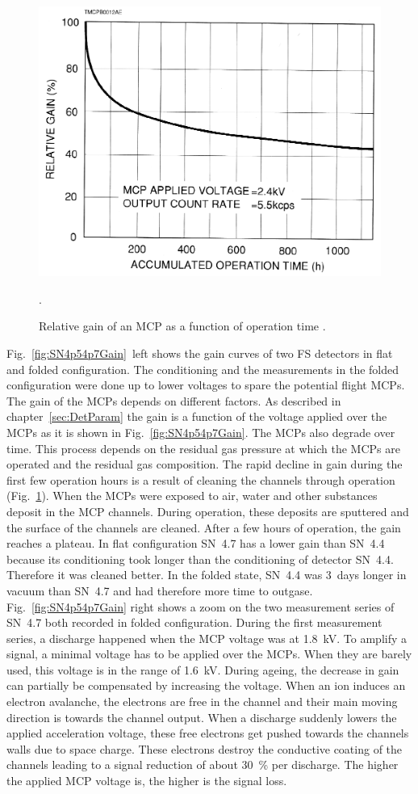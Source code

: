 		\begin{figure}[H] %
	\centering
	\includegraphics[width=.5\textwidth]{Experiments/MCP_relGain_timeevol.png}
	\caption{Relative gain of an MCP as a function of operation time \cite{LecNot_Wurz2017}.}
	\label{fig:MCPrelGainTime}.
\end{figure}
	Fig.~\ref{fig:SN4p54p7Gain}~left shows the gain curves of two FS detectors in flat and folded configuration. The conditioning and the measurements in the folded configuration were done up to lower voltages to spare the potential flight MCPs. The gain of the MCPs depends on different factors. As described in chapter~\ref{sec:DetParam} the gain is a function of the voltage applied over the MCPs as it is shown in Fig.~\ref{fig:SN4p54p7Gain}. 
	The MCPs also degrade over time. This process depends on the residual gas pressure at which the MCPs are operated and the residual gas composition. The rapid decline in gain during the first few operation hours is a result of cleaning the channels through operation (Fig.~\ref{fig:MCPrelGainTime}).
	When the MCPs were exposed to air, water and other substances deposit in the MCP channels. During operation, these deposits are sputtered and the surface of the channels are cleaned. After a few hours of operation, the gain reaches a plateau. In flat configuration SN~4.7 has a lower gain than SN~4.4 because its conditioning took longer than the conditioning of detector SN~4.4. Therefore it was cleaned better. In the folded state, SN~4.4 was 3~days longer in vacuum than SN~4.7 and had therefore more time to outgase. Fig.~\ref{fig:SN4p54p7Gain} right shows a zoom on the two measurement series of SN~4.7 both recorded in folded configuration. During the first measurement series, a discharge happened when the MCP voltage was at 1.8~kV. To amplify a signal, a minimal voltage has to be applied over the MCPs. When they are barely used, this voltage is in the range of 1.6~kV. During ageing, the decrease in gain can partially be compensated by increasing the voltage. When an ion induces an electron avalanche, the electrons are free in the channel and their main moving direction is towards the channel output. When a discharge suddenly lowers the applied acceleration voltage, these free electrons get pushed towards the channels walls due to space charge. These electrons destroy the conductive coating of the channels leading to a signal reduction of about 30~\% per discharge. The higher the applied MCP voltage is, the higher is the signal loss.\\
